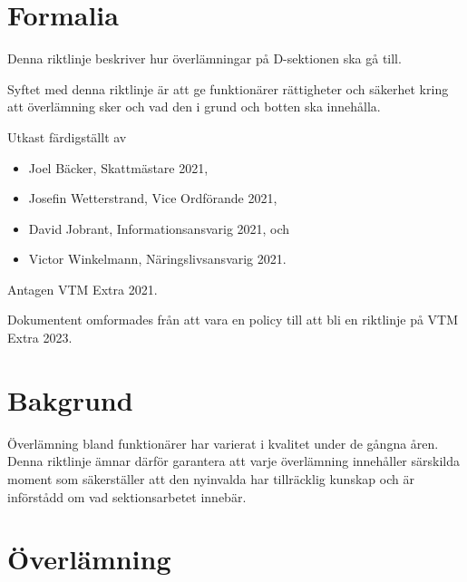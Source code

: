 \documentclass{dsekguideline}
\begin{document}
\maketitle
\section{Formalia}

Denna riktlinje beskriver hur överlämningar på D-sektionen ska gå till.

Syftet med denna riktlinje är att ge funktionärer rättigheter och säkerhet kring
att överlämning sker och vad den i grund och botten ska innehålla.

Utkast färdigställt av
\begin{itemize}
  \item Joel Bäcker, Skattmästare 2021,
  \item Josefin Wetterstrand, Vice Ordförande 2021,
  \item David Jobrant, Informationsansvarig 2021, och
  \item Victor Winkelmann, Näringslivsansvarig 2021.
  \end{itemize}
Antagen VTM Extra 2021.

Dokumentent omformades från att vara en policy till att bli en riktlinje på
VTM Extra 2023.

\section{Bakgrund}

  Överlämning bland funktionärer har varierat i kvalitet under de gångna
  åren. Denna riktlinje ämnar därför garantera att varje överlämning innehåller
  särskilda moment som säkerställer att den nyinvalda har tillräcklig kunskap
  och är införstådd om vad sektionsarbetet innebär.

\section{Överlämning}
\end{document}
